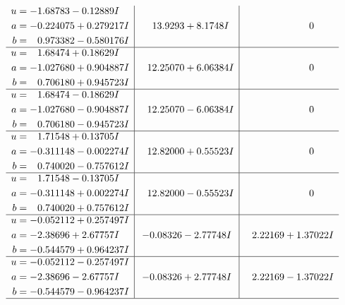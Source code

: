 \documentclass[1p]{elsarticle_modified}
\theoremstyle{definition}
\begin{document}
$$\begin{array}{c|c|c}
\begin{aligned}
u &= -1.68783 - 0.12889 I \\
a &= -0.224075 + 0.279217 I \\
b &= \phantom{-}0.973382 - 0.580176 I\end{aligned}
 & \phantom{-}13.9293 + 8.1748 I & \phantom{-0.000000 } 0 \\ \hline\begin{aligned}
u &= \phantom{-}1.68474 + 0.18629 I \\
a &= -1.027680 + 0.904887 I \\
b &= \phantom{-}0.706180 + 0.945723 I\end{aligned}
 & \phantom{-}12.25070 + 6.06384 I & \phantom{-0.000000 } 0 \\ \hline\begin{aligned}
u &= \phantom{-}1.68474 - 0.18629 I \\
a &= -1.027680 - 0.904887 I \\
b &= \phantom{-}0.706180 - 0.945723 I\end{aligned}
 & \phantom{-}12.25070 - 6.06384 I & \phantom{-0.000000 } 0 \\ \hline\begin{aligned}
u &= \phantom{-}1.71548 + 0.13705 I \\
a &= -0.311148 - 0.002274 I \\
b &= \phantom{-}0.740020 - 0.757612 I\end{aligned}
 & \phantom{-}12.82000 + 0.55523 I & \phantom{-0.000000 } 0 \\ \hline\begin{aligned}
u &= \phantom{-}1.71548 - 0.13705 I \\
a &= -0.311148 + 0.002274 I \\
b &= \phantom{-}0.740020 + 0.757612 I\end{aligned}
 & \phantom{-}12.82000 - 0.55523 I & \phantom{-0.000000 } 0 \\ \hline\begin{aligned}
u &= -0.052112 + 0.257497 I \\
a &= -2.38696 + 2.67757 I \\
b &= -0.544579 + 0.964237 I\end{aligned}
 & -0.08326 - 2.77748 I & \phantom{-}2.22169 + 1.37022 I \\ \hline\begin{aligned}
u &= -0.052112 - 0.257497 I \\
a &= -2.38696 - 2.67757 I \\
b &= -0.544579 - 0.964237 I\end{aligned}
 & -0.08326 + 2.77748 I & \phantom{-}2.22169 - 1.37022 I\\
 \hline 
 \end{array}$$\newpage\newpage\renewcommand{\arraystretch}{1}
\end{document}
